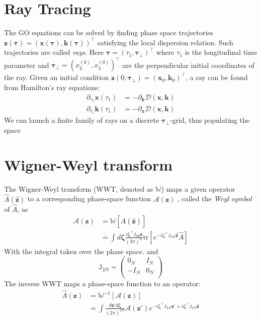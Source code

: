 \documentclass{article}
\begin{document}
\section{Ray Tracing}
The GO equations can be solved by finding phase space trajectories
$\mathbf{z}(\mathbf{\tau}) = (\mathbf{x}(\mathbf{\tau}),\mathbf{k}(\mathbf{\tau}))^\intercal$ satisfying the local dispersion  relation. Such trajectories are called \textit{rays}.
Here $\mathbf{\tau} = (\tau_1,\mathbf{\tau}_\perp)^\intercal$ where $\tau_1$ is the longitudinal time parameter and $\mathbf{\tau}_\perp = (x_2^ {(0)},x_3^ {(0)})^\intercal$ are the perpendicular initial coordinates of the ray.
Given an initial condition $\mathbf{z}(0,\mathbf{\tau}_\perp) = (\mathbf{x}_0,\mathbf{k}_0)^\intercal$, a ray can be found from Hamilton's ray equations:
\begin{eqnarray}
    \partial_{\tau_1}\mathbf{x}(\tau_1) &= -\partial_{\mathbf{k}}\mathcal{D}(\mathbf{x},\mathbf{k})\\
    \partial_{\tau_1}\mathbf{k}(\tau_1) &= -\partial_{\mathbf{x}}\mathcal{D}(\mathbf{x},\mathbf{k})
\end{eqnarray}
We can launch a finite family of rays on a discrete $\mathbf{\tau}_\perp$-grid,
thus populating the space
\appendix
\section{Wigner-Weyl transform}
\label{appendix:Weyl}
The Wigner-Weyl transform (WWT, denoted as $\mathbb{W}$)
maps a given operator $\hat{A}(\hat{\mathbf{z}})$ to a corresponding phase-space function $\mathcal{A}(\mathbf{z})$ , called the 
\textit{Weyl symbol} of $\hat{A}$, as
\begin{eqnarray}
    \mathcal{A}(\mathbf{z}) &= \mathbb{W}[\hat{A}(\hat{\mathbf{z}})]\\
                            &\stackrel{.}{=} \int d\mathcal{\mathbf{\zeta} }\frac{i \mathbf{\zeta}^\intercal \mathtt{J_{2N}\mathbf{z}}}{(2\pi)^N} \text{tr}[e^{-i \mathbf{\zeta}^\intercal \mathtt{J}_{2N} \hat{\mathbf{z}}}\hat{A}]
\end{eqnarray}
With the integral taken over the phase space. and
\begin{equation}
    \mathtt{J}_{2N} = 
    \left(
    \begin{matrix}
        0_N & I_N\\
        -I_N & 0_N\\
    \end{matrix}
    \right)
\end{equation}
The inverse WWT maps a phase-space function to an operator:
\begin{eqnarray}
    \hat{A}(\mathbf{z}) &= \mathbb{W}^{-1}[\mathcal{A}(\mathbf{z})]\\
                        &\stackrel{.}{=} \int \frac{d\mathbf{z}'d\mathcal{\mathbf{\zeta} }}{(2\pi)^{2N}}\mathcal{A}(\mathbf{z}')e^{-i \mathbf{\zeta}^\intercal \mathtt{J}_{2N} \mathbf{z}' + i \mathbf{\zeta}^\intercal \mathtt{J}_{2N} \hat{\mathbf{z}}}
\end{eqnarray}
\end{document}
